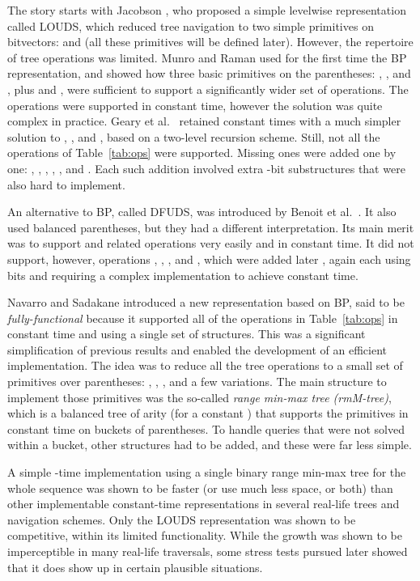 \documentclass[11pt]{article}
\newcommand{\0}{\mathit{0}}
\newcommand{\1}{\mathit{1}}
\begin{document}
The story starts with Jacobson \cite{Jac89}, 
who proposed a simple levelwise representation called LOUDS, which reduced 
tree navigation to two simple primitives on bitvectors:  and 
 (all these primitives will be defined later). 
However, the repertoire of tree operations was limited. Munro and Raman 
\cite{MR01} used for the first time the BP representation, and showed how 
three basic primitives on the parentheses: , , and , 
plus  and , were sufficient to support a significantly wider 
set of operations. The operations were supported in constant time, however
the solution was quite complex in practice. Geary et al.~\cite{GRRR06} retained 
constant times with a much simpler solution to , , and 
, based on a two-level recursion scheme. Still, not all the
operations of Table~\ref{tab:ops} were supported. Missing ones were
added one by one:  \cite{CLL05},  \cite{MRRR12}, 
, , , and  \cite{LY08}. Each such addition
involved extra -bit substructures that were also hard to 
implement.

An alternative to BP, called DFUDS, was introduced by Benoit et 
al.~\cite{BDMRRR05}. It also used  balanced parentheses, but they had a
different interpretation. Its main merit was to support  and related 
operations very easily and in constant time. It did not support, however, 
operations , , , and , which were added 
later \cite{GRR06,JSS12}, again each using  bits and requiring a complex
implementation to achieve constant time.

Navarro and Sadakane \cite{NS14} introduced a new representation based on BP,
said to be {\em fully-functional} because it supported all of the operations
in Table~\ref{tab:ops} in constant time and using a single set of structures.
This was a significant simplification of previous results and enabled the
development of an efficient implementation. The idea was to reduce all the
tree operations to a small set of primitives over parentheses:
, , , and a few variations. The main structure
to implement those primitives was the so-called {\em range min-max tree
(rmM-tree)}, which is a balanced tree of arity  (for a constant
) that supports the primitives in constant time on buckets of 
 parentheses. To handle queries that were not solved 
within a bucket, other structures had to be added, and these were far less simple.

A simple -time implementation using a single binary range min-max 
tree for the whole sequence \cite{ACNS10} was shown to be faster (or use much less space, or both)
than other implementable constant-time representations \cite{GRRR06} in several
real-life trees and navigation schemes. Only the LOUDS representation was
shown to be competitive, within its limited functionality. 
While the  growth was shown to be imperceptible in many real-life
traversals, some stress tests pursued later \cite{JR12} showed
that it does show up in certain plausible situations.
\end{document}
